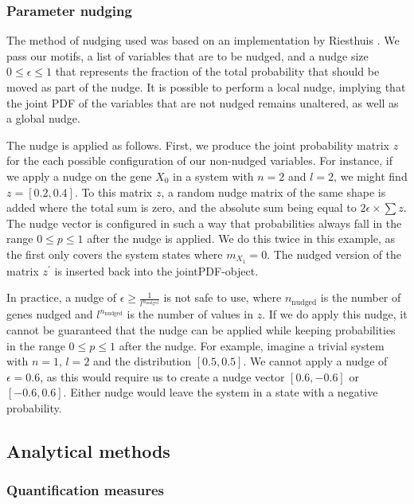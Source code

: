 \documentclass[../main.tex]{subfiles}
\begin{document}
\subsubsection{Parameter nudging}

The method of nudging used was based on an implementation by Riesthuis \cite{DJ_repository}.
We pass our motifs, a list of variables that are to be nudged, and a nudge size $0 \le \epsilon \le 1$ that represents the fraction of the total probability that should be moved as part of the nudge.
It is possible to perform a local nudge, implying that the joint PDF of the variables that are not nudged remains unaltered, as well as a global nudge.

The nudge is applied as follows.
First, we produce the joint probability matrix $z$ for the each possible configuration of our non-nudged variables.
For instance, if we apply a nudge on the gene $X_0$ in a system with $n=2$ and $l=2$, we might find $z = [0.2, 0.4]$.
To this matrix $z$, a random nudge matrix of the same shape is added where the total sum is zero, and the absolute sum being equal to $2 \epsilon \times \sum z$.
The nudge vector is configured in such a way that probabilities always fall in the range $0 \le p \le 1$ after the nudge is applied.
We do this twice in this example, as the first only covers the system states where $m_{X_1} = 0$.
The nudged version of the matrix $z^\prime$ is inserted back into the jointPDF-object.

In practice, a nudge of $\epsilon \ge \frac{1}{l^{n_\mathrm{nudged}}}$ is not safe to use, where $n_\mathrm{nudged}$ is the number of genes nudged and $l^{n_\mathrm{nudged}}$ is the number of values in $z$.
If we do apply this nudge, it cannot be guaranteed that the nudge can be applied while keeping probabilities in the range $0 \le p \le 1$ after the nudge.
For example, imagine a trivial system with $n = 1$, $l = 2$ and the distribution $[0.5, 0.5]$.
We cannot apply a nudge of $\epsilon = 0.6$, as this would require us to create a nudge vector $[0.6, -0.6]$ or $[-0.6, 0.6]$.
Either nudge would leave the system in a state with a negative probability.

\subsection{Analytical methods}

\subsubsection{Quantification measures}
\end{document}
